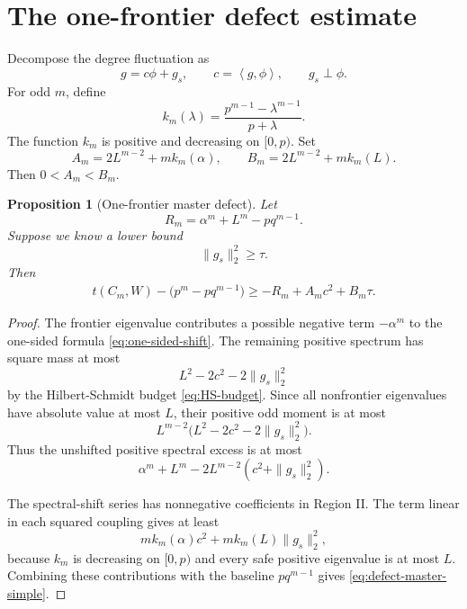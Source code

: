 \documentclass[11pt]{article}
\newtheorem{proposition}[theorem]{Proposition}
\newcommand{\ip}[2]{\left\langle #1,#2\right\rangle}
\begin{document}
\section{The one-frontier defect estimate}

Decompose the degree fluctuation as
\begin{equation}\label{eq:g-decomp}
        g=c\phi+g_s,
        \qquad c=\ip{g}{\phi},
        \qquad g_s\perp\phi.
\end{equation}
For odd $m$, define
\begin{equation}\label{eq:kdef}
        k_m(\lambda)=\frac{p^{m-1}-\lambda^{m-1}}{p+\lambda}.
\end{equation}
The function $k_m$ is positive and decreasing on $[0,p)$.
Set
\begin{equation}\label{eq:AB-def}
        A_m=2L^{m-2}+m k_m(\alpha),
        \qquad
        B_m=2L^{m-2}+m k_m(L).
\end{equation}
Then $0<A_m<B_m$.

\begin{proposition}[One-frontier master defect]\label{prop:master-defect}
Let
\begin{equation}\label{eq:R-def}
        R_m=\alpha^m+L^m-pq^{m-1}.
\end{equation}
Suppose we know a lower bound
\[
        \|g_s\|_2^2\ge \tau.
\]
Then
\begin{equation}\label{eq:defect-master-simple}
\begin{split}
        t(C_m,W)-\bigl(p^m-pq^{m-1}\bigr)
        \ge -R_m+A_m c^2+B_m\tau.
\end{split}
\end{equation}
\end{proposition}

\begin{proof}
The frontier eigenvalue contributes a possible negative term $-\alpha^m$
to the one-sided formula \eqref{eq:one-sided-shift}.  The remaining
positive spectrum has square mass at most
\[
        L^2-2c^2-2\|g_s\|_2^2
\]
by the Hilbert-Schmidt budget \eqref{eq:HS-budget}.  Since all nonfrontier
eigenvalues have absolute value at most $L$, their positive odd moment is
at most
\[
        L^{m-2}\bigl(L^2-2c^2-2\|g_s\|_2^2\bigr).
\]
Thus the unshifted positive spectral excess is at most
\[
        \alpha^m+L^m-2L^{m-2}(c^2+\|g_s\|_2^2).
\]

The spectral-shift series has nonnegative coefficients in Region II.
The term linear in each squared coupling gives at least
\[
        m k_m(\alpha)c^2+m k_m(L)\|g_s\|_2^2,
\]
because $k_m$ is decreasing on $[0,p)$ and every safe positive eigenvalue
is at most $L$.  Combining these contributions with the baseline
$pq^{m-1}$ gives \eqref{eq:defect-master-simple}.
\end{proof}
\end{document}
